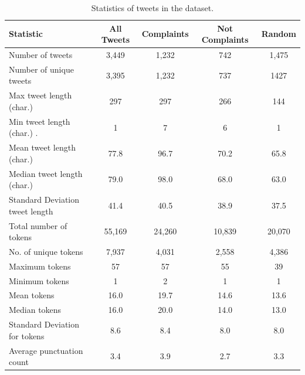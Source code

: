 \begin{table}[htbp]
    \captionsetup{font=small}
    \centering
    \begin{tabularx}{\textwidth}{|X|c|c|c|c|}
        \hline
        \rowcolor[gray]{0.7}
        \textbf{Statistic}                        & \textbf{All Tweets} & \textbf{Complaints} & \textbf{Not Complaints} & \textbf{Random} \\
        \hline
        Number of tweets                 & 3,449      & 1,232      & 742            & 1,475  \\
        \hline
        Number of unique tweets          & 3,395      & 1,232      & 737            & 1427   \\
        \hline
        \hline
        Max tweet length (char.)    & 297        & 297        & 266            & 144    \\
        \hline
        Min tweet length (char.)   .& 1          & 7          & 6              & 1      \\
        \hline
        Mean tweet length (char.)   & 77.8       & 96.7       & 70.2           & 65.8   \\
        \hline
        Median tweet length (char.) & 79.0       & 98.0       & 68.0           & 63.0   \\
        \hline
        Standard Deviation tweet length  & 41.4       & 40.5       & 38.9           & 37.5   \\
        \hline
        \hline
        Total number of tokens           & 55,169     & 24,260     & 10,839         & 20,070 \\
        \hline
        No. of unique tokens             & 7,937      & 4,031      & 2,558          & 4,386  \\
        \hline
        Maximum tokens                   & 57         & 57         & 55             & 39     \\
        \hline
        Minimum tokens                   & 1          & 2          & 1              & 1      \\
        \hline
        Mean tokens                      & 16.0       & 19.7       & 14.6           & 13.6   \\
        \hline
        Median tokens                    & 16.0       & 20.0       & 14.0           & 13.0   \\
        \hline
        Standard Deviation for tokens    & 8.6        & 8.4        & 8.0            & 8.0    \\
        \hline
        \hline
        Average punctuation count        & 3.4        & 3.9        & 2.7            & 3.3    \\
        \hline
    \end{tabularx}
    \caption{Statistics of tweets in the dataset.}
    \label{tab: tweets_statistics}
\end{table}



